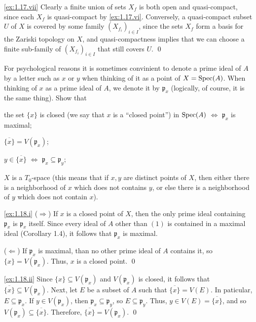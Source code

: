 \noindent
\ref{ex:1.17.vii}
Clearly a finite union of sets $X_f$ is both open and quasi-compact, since each $X_f$ is quasi-compact by \ref{ex:1.17.vi}.
Conversely, a quasi-compact subset $U$ of $X$ is covered by some family $(X_{f_i})_{i\in I}$, since the sets $X_f$ form a basis for the Zariski topology on $X$, and quasi-compactness implies that we can choose a finite sub-family of $(X_{f_i})_{i\in I}$ that still covers $U$.
\qed






\begin{exercise}
\label{ex:1.18}
For psychological reasons it is sometimes convinient to denote a prime ideal of $A$ by a letter such as $x$ or $y$ when thinking of it as a point of $X = \operatorname{Spec}(A)$.
When thinking of $x$ as a prime ideal of $A$, we denote it by $\mathfrak p_x$ (logically, of course, it is the same thing).
Show that
\begin{rlist}
\item
\label{ex:1.18.i}
the set $\{x\}$ is closed (we say that $x$ is a ``closed point'') in $\operatorname{Spec}(A)$ $\iff$ $\mathfrak p_x$ is maximal;
\item
\label{ex:1.18.ii}
$\overline{\{x\}} = V(\mathfrak p_x)$;
\item
\label{ex:1.18.iii}
$y \in \overline{\{x\}}$ $\iff$ $\mathfrak p_x \subseteq \mathfrak p_y$;
\item
\label{ex:1.18.iv}
$X$ is a $T_0$-space (this means that if $x,y$ are distinct points of $X$, then either there is a neighborhood of $x$ which does not contains $y$, or else there is a neighborhood of $y$ which does not contain $x$).
\end{rlist}
\end{exercise}

\noindent
\ref{ex:1.18.i}
($\Rightarrow$)
If $x$ is a closed point of $X$, then the only prime ideal containing $\mathfrak p_x$ is $\mathfrak p_x$ itself.
Since every ideal of $A$ other than $(1)$ is contained in a maximal ideal (Corollary 1.4), it follows that $\mathfrak p_x$ is maximal.

($\Leftarrow$)
If $\mathfrak p_x$ is maximal, than no other prime ideal of $A$ contains it, so $\{x\} = V(\mathfrak p_x)$.
Thus, $x$ is a closed point.
\qed

\noindent
\ref{ex:1.18.ii}
Since $\{x\} \subseteq V(\mathfrak p_x)$ and $V(\mathfrak p_x)$ is closed, it follows that $\overline{\{x\}} \subseteq V(\mathfrak p_x)$.
Next, let $E$ be a subset of $A$ such that $\overline{\{x\}} = V(E)$.
In paticular, $E \subseteq \mathfrak p_x$.
If $y \in V(\mathfrak p_x)$, then $\mathfrak p_x \subseteq \mathfrak p_y$, so $E \subseteq \mathfrak p_y$.
Thus, $y \in V(E) = \overline{\{x\}}$, and so $V(\mathfrak p_x) \subseteq \overline{\{x\}}$.
Therefore, $\overline{\{x\}} = V(\mathfrak p_x)$.
\qed

